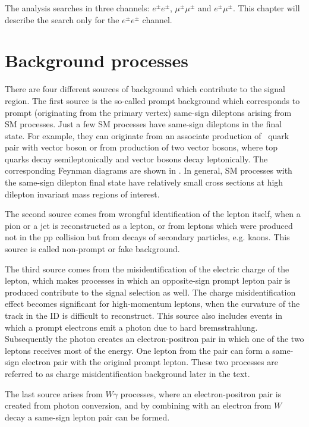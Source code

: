 The analysis searches in three channels: $e^{\pm}e^{\pm}$, $\mu^{\pm}\mu^{\pm}$ and $e^{\pm}\mu^{\pm}$.
This chapter will describe the search only for the $e^{\pm}e^{\pm}$ channel.

\section{Background processes}
\label{sec:wprimeBackgrounds}

There are four different sources of background which contribute to the signal region.
The first source is the so-called prompt background which corresponds to prompt (originating from the primary vertex) same-sign dileptons arising from SM processes.
Just a few SM processes have same-sign dileptons in the final state. 
For example, they can originate from an associate production of \ttbar~quark pair with vector boson or from production of two vector bosons,
where top quarks decay semileptonically and vector bosons decay leptonically.
The corresponding Feynman diagrams are shown in .
In general, SM processes with the same-sign dilepton final state have relatively small cross sections at high dilepton invariant mass regions of interest.

The second source comes from wrongful identification of the lepton itself, when a pion or a jet is reconstructed as a lepton, or from leptons which were produced 
not in the pp collision but from decays of secondary particles, e.g. kaons. This source is called non-prompt or fake background.

The third source comes from the misidentification of the electric charge of the lepton, which makes processes in which an opposite-sign prompt lepton pair is produced 
contribute to the signal selection as well. The charge misidentification effect becomes significant for high-momentum leptons, when the curvature of the track in the ID is difficult to reconstruct. 
This source also includes events in which a prompt electrons emit a photon due to hard bremsstrahlung. Subsequently the photon creates an electron-positron pair in which one of the two leptons receives most of the energy.
One lepton from the pair can form a same-sign electron pair with the original prompt lepton. These two processes are referred to as charge misidentification 
background later in the text.

The last source arises from $W\gamma$ processes, where an electron-positron pair is created from photon conversion, and by combining with an electron from $W$ decay
a same-sign lepton pair can be formed. 

